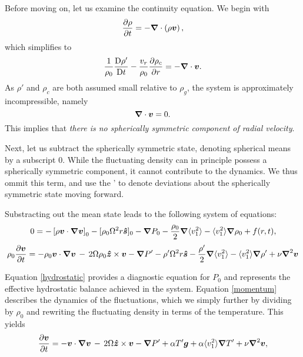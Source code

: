 Before moving on, let us examine the continuity equation.   We begin with
\begin{equation}
\frac{\partial \rho}{\partial t} = -\boldsymbol{\nabla}\cdot\left(\rho\boldsymbol{v}\right),
\end{equation}
which simplifies to 
\begin{equation}
\frac{1}{\rho_0}\frac{\mathrm{D}\rho'}{\mathrm{D}t}-\frac{v_r}{\rho_0}\frac{\partial \rho_c}{\partial r} = -\boldsymbol{\nabla}\cdot\boldsymbol{v}.
\end{equation}
As $\rho'$ and $\rho_c$ are both assumed small relative to $\rho_g$, the system is approximately incompressible, namely
\begin{equation}
\boldsymbol{\nabla}\cdot\boldsymbol{v} = 0.
\end{equation}
This implies that {\em there is no spherically symmetric component of radial velocity}.

Next, let us subtract the spherically symmetric state, denoting spherical means by a subscript 0.   While the fluctuating density can in principle possess a spherically symmetric component, it cannot contribute to the dynamics. We thus ommit this term, and use the ' to denote deviations about the spherically symmetric state moving forward.

Substracting out the mean state leads to the following system of equations:
\begin{equation}
\label{hydrostatic}
0   =  - \left[\rho\vvec\cdot\boldsymbol{\nabla}\vvec\right]_0
- [\rho_0\Omega^2r\boldsymbol{\hat{s}}]_0
-\boldsymbol{\nabla}P_0  %
						        - \frac{\rho_0}{2}\boldsymbol{\nabla}\langle v_1^2\rangle
							- \langle v_1^2\rangle\boldsymbol{\nabla}\rho_0
							+ f(r,t),
\end{equation}
\begin{equation}
\label{momentum}
\rho_0\frac{ \partial \vvec }{\partial t}   =  - \rho_0\vvec\cdot\boldsymbol{\nabla}\vvec
\,-\, 2\Omega\rho_0\boldsymbol{\hat{z}}\times\vvec  
-\boldsymbol{\nabla}P'  %
-\rho'\Omega^2r\boldsymbol{\hat{s}}
						        - \frac{\rho'}{2}\boldsymbol{\nabla}\langle v_1^2\rangle
							- \langle v_1^2\rangle\boldsymbol{\nabla}\rho'
+ \nu\boldsymbol{\nabla}^2\vvec
\end{equation}

Equation \ref{hydrostatic} provides a diagnostic equation for $P_0$ and represents the effective hydrostatic balance achieved in the system.  Equation \ref{momentum} describes the dynamics of the fluctuations, which we simply further by dividing by $\rho_0$ and rewriting the fluctuating density in terms of the temperature.  This yields
\begin{equation}
\frac{ \partial \vvec }{\partial t}   =  - \vvec\cdot\boldsymbol{\nabla}\vvec
\,-\, 2\Omega\boldsymbol{\hat{z}}\times\vvec  
-\boldsymbol{\nabla}P'  %
						        + \alpha T' \boldsymbol{g}
							+\alpha \langle v_1^2\rangle\boldsymbol{\nabla} T'
+ \nu\boldsymbol{\nabla}^2\vvec,
\end{equation}

